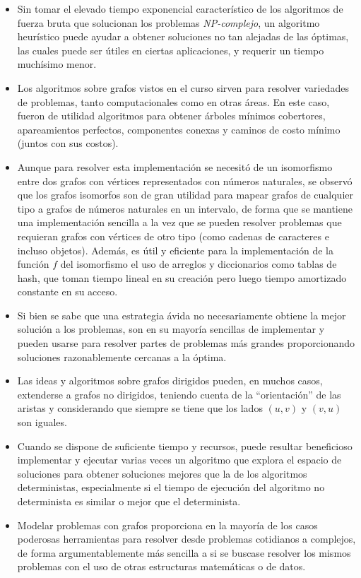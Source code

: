 \documentclass[11pt]{article}
\begin{document}
\begin{itemize}
   \item Sin tomar el elevado tiempo exponencial característico de
   los algoritmos de fuerza bruta que solucionan los problemas
   \emph{NP-complejo}, un algoritmo heurístico puede ayudar a obtener
   soluciones no tan alejadas de las óptimas, las cuales puede ser
   útiles en ciertas aplicaciones, y requerir un tiempo muchísimo
   menor.

   \item Los algoritmos sobre grafos vistos en el curso sirven
   para resolver variedades de problemas, tanto computacionales
   como en otras áreas. En este caso, fueron de utilidad algoritmos
   para obtener árboles mínimos cobertores, apareamientos perfectos,
   componentes conexas y caminos de costo mínimo (juntos con sus
   costos).

   \item Aunque para resolver esta implementación se necesitó de 
   un isomorfismo entre dos grafos con vértices representados con 
   números naturales, se observó que los grafos isomorfos son de
   gran utilidad para mapear grafos de cualquier tipo a grafos de
   números naturales en un intervalo, de forma que se mantiene una
   implementación sencilla a la vez que se pueden resolver problemas
   que requieran grafos con vértices de otro tipo (como cadenas de
   caracteres e incluso objetos). Además, es útil y eficiente para
   la implementación de la función $f$ del isomorfismo el uso de arreglos
   y diccionarios como tablas de hash, que toman tiempo lineal en su
   creación pero luego tiempo amortizado constante en su acceso.

   \item Si bien se sabe que una estrategia ávida no necesariamente
   obtiene la mejor solución a los problemas, son en su mayoría
   sencillas de implementar y pueden usarse para resolver partes
   de problemas más grandes proporcionando soluciones razonablemente
   cercanas a la óptima.

   \item Las ideas y algoritmos sobre grafos dirigidos pueden, en
   muchos casos, extenderse a grafos no dirigidos, teniendo cuenta
   de la ``orientación'' de las aristas y considerando que siempre se 
   tiene que los lados $(u, v)$ y $(v, u)$ son iguales.

   \item Cuando se dispone de suficiente tiempo y recursos, puede
   resultar beneficioso implementar y ejecutar varias veces un
   algoritmo que explora el espacio de soluciones para obtener
   soluciones mejores que la de los algoritmos deterministas, 
   especialmente si el tiempo de ejecución del algoritmo no
   determinista es similar o mejor que el determinista.

   \item Modelar problemas con grafos proporciona en la mayoría de
   los casos poderosas herramientas para resolver desde problemas
   cotidianos a complejos, de forma argumentablemente más sencilla
   a si se buscase resolver los mismos problemas con el uso de 
   otras estructuras matemáticas o de datos.

\end{itemize}
\end{document}
